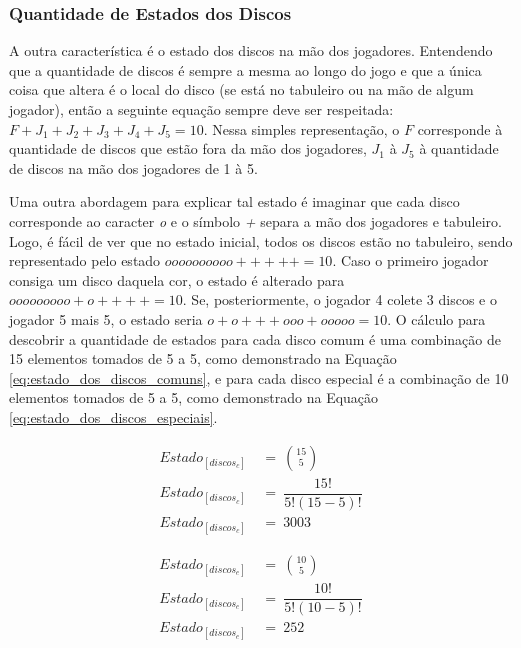 \subsubsection{Quantidade de Estados dos Discos}

A outra característica é o estado dos discos na mão dos jogadores. Entendendo que a quantidade de discos é sempre a mesma ao longo do jogo e que a única coisa que altera é o local do disco (se está no tabuleiro ou na mão de algum jogador), então a seguinte equação sempre deve ser respeitada: $F+J_1+J_2+J_3+J_4+J_5 = 10$. Nessa simples representação, o $F$ corresponde à quantidade de discos que estão fora da mão dos jogadores, $J_1$ à $J_5$ à quantidade de discos na mão dos jogadores de 1 à 5.

Uma outra abordagem para explicar tal estado é imaginar que cada disco corresponde ao caracter \emph{o} e o símbolo \emph{+} separa a mão dos jogadores e tabuleiro. Logo, é fácil de ver que no estado inicial, todos os discos estão no tabuleiro, sendo representado pelo estado $oooooooooo+++++=10$. Caso o primeiro jogador consiga um disco daquela cor, o estado é alterado para $ooooooooo+o++++=10$. Se, posteriormente, o jogador 4 colete 3 discos e o jogador 5 mais 5, o estado seria $o+o+++ooo+ooooo=10$. O cálculo para descobrir a quantidade de estados para cada disco comum é uma combinação de 15 elementos tomados de 5 a 5, como demonstrado na Equação \ref{eq:estado_dos_discos_comuns}, e para cada disco especial é a combinação de 10 elementos tomados de 5 a 5, como demonstrado na Equação \ref{eq:estado_dos_discos_especiais}.

\begin{equation} \label{eq:estado_dos_discos_comuns} \tag{e.q. Estado dos discos comuns}
\begin{split}
	Estado_{[discos_c]}\ &=\ \binom{15}{5}\\
	Estado_{[discos_c]}\ &=\ \dfrac{15!}{5!(15-5)!}\\
	Estado_{[discos_c]}\ &=\ 3003
\end{split}
\end{equation}

\begin{equation} \label{eq:estado_dos_discos_especiais} \tag{e.q. Estado dos discos especiais}
\begin{split}
	Estado_{[discos_e]}\ &=\ \binom{10}{5}\\
	Estado_{[discos_e]}\ &=\ \dfrac{10!}{5!(10-5)!}\\
	Estado_{[discos_e]}\ &=\ 252
\end{split}
\end{equation}

